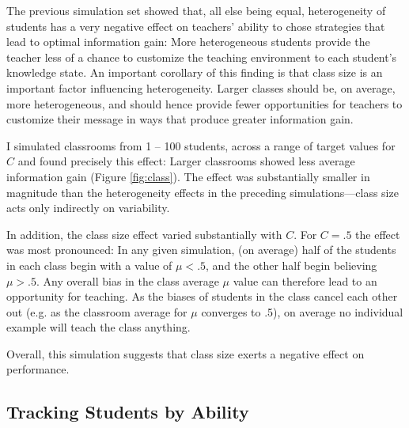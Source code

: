 \documentclass[10pt,letterpaper]{article}
\begin{document}

The previous simulation set showed that, all else being equal, heterogeneity of students has a very negative effect on teachers' ability to chose strategies that lead to optimal information gain: More heterogeneous students provide the teacher less of a chance to customize the teaching environment to each student's knowledge state. An important corollary of this finding is that class size is an important factor influencing heterogeneity. Larger classes should be, on average, more heterogeneous, and should hence provide fewer opportunities for teachers to customize their message in ways that produce greater information gain.

I simulated classrooms from 1 -- 100 students, across a range of target values for $C$ and found precisely this effect: Larger classrooms showed less average information gain (Figure \ref{fig:class}). The  effect was substantially smaller in magnitude than the heterogeneity effects in the preceding simulations---class size acts only indirectly on variability. 


In addition, the class size effect varied substantially with $C$. For $C=.5$ the effect was most pronounced: In any given simulation, (on average) half of the students in each class begin with a value of $\mu < .5$, and the other half begin believing $\mu > .5$. Any overall bias in the class average $\mu$ value can therefore lead to an opportunity for teaching. As the biases of students in the class cancel each other out (e.g. as the classroom average for $\mu$ converges to .5), on average no individual example will teach the class anything. 

Overall, this simulation suggests that class size exerts a negative effect on performance. 

\subsection{Tracking Students by Ability}
\end{document}
